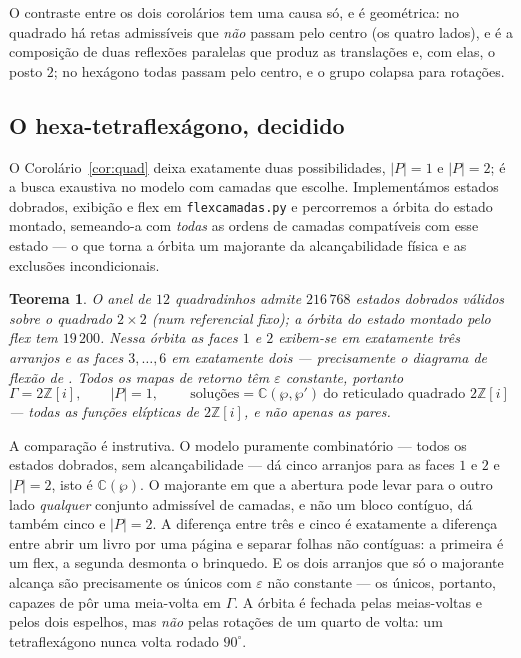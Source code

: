 \documentclass[11pt,a4paper]{article}
\theoremstyle{plain}
\newtheorem{teorema}{Teorema}[section]
\theoremstyle{definition}
\theoremstyle{remark}
\newcommand{\C}{\mathbb{C}}
\newcommand{\Z}{\mathbb{Z}}
\newcommand{\Zi}{\Z[i]}
\begin{document}
\noindent O contraste entre os dois corolários tem uma causa só, e é
geométrica: no quadrado há retas admissíveis que \emph{não} passam pelo centro
(os quatro lados), e é a composição de duas reflexões paralelas que produz as
translações e, com elas, o posto $2$; no hexágono todas passam pelo centro, e
o grupo colapsa para rotações.

\subsection*{O hexa-tetraflexágono, decidido}

O Corolário~\ref{cor:quad} deixa exatamente duas possibilidades, $|P|=1$ e
$|P|=2$; é a busca exaustiva no modelo com camadas que escolhe. Implementámos
estados dobrados, exibição e flex em \texttt{flexcamadas.py} e percorremos a
órbita do estado montado, semeando-a com \emph{todas} as ordens de camadas
compatíveis com esse estado --- o que torna a órbita um majorante da
alcançabilidade física e as exclusões incondicionais.

\begin{teorema}\label{thm:decidido}
O anel de $12$ quadradinhos admite $216\,768$ estados dobrados válidos sobre o
quadrado $2\times2$ (num referencial fixo); a órbita do estado montado pelo
flex tem $19\,200$. Nessa órbita as faces $1$ e $2$ exibem-se em exatamente
três arranjos e as faces $3,\dots,6$ em exatamente dois --- precisamente o
diagrama de flexão de \cite{enimar}. Todos os mapas de retorno têm
$\varepsilon$ constante, portanto
\[
\Gamma=2\Zi,\qquad |P|=1,\qquad
\boxed{\ \text{soluções}=\C(\wp,\wp')\ \text{do reticulado quadrado }2\Zi\ }
\]
--- todas as funções elípticas de $2\Zi$, e não apenas as pares.
\end{teorema}

A comparação é instrutiva. O modelo puramente combinatório --- todos os
estados dobrados, sem alcançabilidade --- dá cinco arranjos para as faces $1$
e $2$ e $|P|=2$, isto é $\C(\wp)$. O majorante em que a abertura pode levar
para o outro lado \emph{qualquer} conjunto admissível de camadas, e não um
bloco contíguo, dá também cinco e $|P|=2$. A diferença entre três e cinco é
exatamente a diferença entre abrir um livro por uma página e separar folhas
não contíguas: a primeira é um flex, a segunda desmonta o brinquedo. E os dois
arranjos que só o majorante alcança são precisamente os únicos com
$\varepsilon$ não constante --- os únicos, portanto, capazes de pôr uma
meia-volta em $\Gamma$. A órbita é fechada pelas meias-voltas e pelos dois
espelhos, mas \emph{não} pelas rotações de um quarto de volta: um
tetraflexágono nunca volta rodado $90^\circ$.
\end{document}
